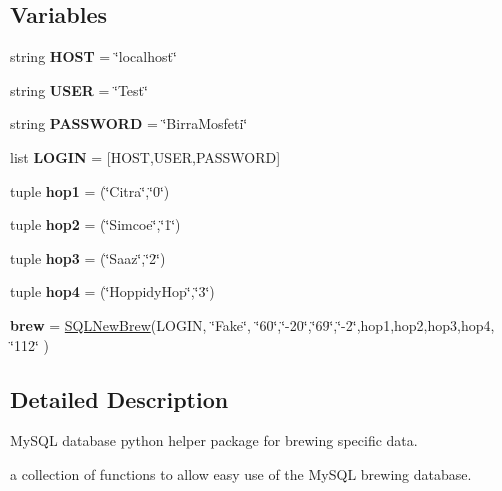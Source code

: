 \subsection*{Variables}
\begin{DoxyCompactItemize}
\item 
\mbox{\label{namespacesql_brewing_comms_a5315d48d2c7d032bdde543d8550856f2}} 
string {\bfseries H\+O\+ST} = \char`\"{}localhost\char`\"{}
\item 
\mbox{\label{namespacesql_brewing_comms_a8fe3f5dcc4e5b97252ca7a11d85bdf58}} 
string {\bfseries U\+S\+ER} = \char`\"{}Test\char`\"{}
\item 
\mbox{\label{namespacesql_brewing_comms_a3a6891f4aa20a11f0c35f557009da018}} 
string {\bfseries P\+A\+S\+S\+W\+O\+RD} = \char`\"{}Birra\+Mosfeti\char`\"{}
\item 
\mbox{\label{namespacesql_brewing_comms_af5b4fbffcf4464ce5e3f00e79e3a7afb}} 
list {\bfseries L\+O\+G\+IN} = \mbox{[}H\+O\+ST,U\+S\+ER,P\+A\+S\+S\+W\+O\+RD\mbox{]}
\item 
\mbox{\label{namespacesql_brewing_comms_a3044d806d3e1efb9ae07762b0329848e}} 
tuple {\bfseries hop1} = (\char`\"{}Citra\char`\"{},\char`\"{}0\char`\"{})
\item 
\mbox{\label{namespacesql_brewing_comms_a3284d4d85e903412136d1d987f7a42b5}} 
tuple {\bfseries hop2} = (\char`\"{}Simcoe\char`\"{},\char`\"{}1\char`\"{})
\item 
\mbox{\label{namespacesql_brewing_comms_aa065a0c47ffd2a3ea458abc04312b223}} 
tuple {\bfseries hop3} = (\char`\"{}Saaz\char`\"{},\char`\"{}2\char`\"{})
\item 
\mbox{\label{namespacesql_brewing_comms_aeb86752cc43974092cd63d43d34d5613}} 
tuple {\bfseries hop4} = (\char`\"{}Hoppidy\+Hop\char`\"{},\char`\"{}3\char`\"{})
\item 
\mbox{\label{namespacesql_brewing_comms_ace725cb0f77fdd50ee6d7e3798ae94a3}} 
{\bfseries brew} = \mbox{\hyperlink{classsql_brewing_comms_1_1_s_q_l_new_brew}{S\+Q\+L\+New\+Brew}}(L\+O\+G\+IN, \char`\"{}Fake\char`\"{}, \char`\"{}60\char`\"{},\char`\"{}-\/20\char`\"{},\char`\"{}69\char`\"{},\char`\"{}-\/2\char`\"{},hop1,hop2,hop3,hop4, \char`\"{}112\char`\"{} )
\end{DoxyCompactItemize}


\subsection{Detailed Description}
My\+S\+QL database python helper package for brewing specific data. 

a collection of functions to allow easy use of the My\+S\+QL brewing database. 